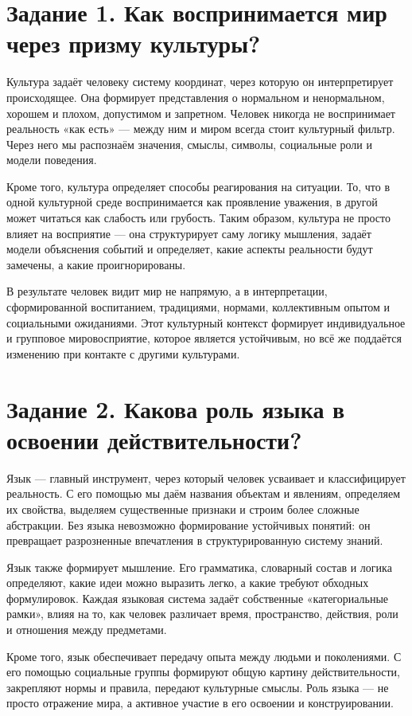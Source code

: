 \documentclass[14pt,a4paper]{extarticle}
\begin{document}
\section{Задание 1. Как воспринимается мир через призму культуры?}
\begin{sloppypar}
Культура задаёт человеку систему координат, через которую он интерпретирует
    происходящее. Она формирует представления о нормальном и ненормальном,
    хорошем и плохом, допустимом и запретном. Человек никогда не воспринимает
    реальность «как есть» — между ним и миром всегда стоит культурный фильтр.
    Через него мы распознаём значения, смыслы, символы, социальные роли и
    модели поведения.

    Кроме того, культура определяет способы реагирования на ситуации. То, что в
    одной культурной среде воспринимается как проявление уважения, в другой
    может читаться как слабость или грубость. Таким образом, культура не просто
    влияет на восприятие — она структурирует саму логику мышления, задаёт
    модели объяснения событий и определяет, какие аспекты реальности будут
    замечены, а какие проигнорированы.

    В результате человек видит мир не напрямую, а в интерпретации,
    сформированной воспитанием, традициями, нормами, коллективным опытом и
    социальными ожиданиями. Этот культурный контекст формирует индивидуальное и
    групповое мировосприятие, которое является устойчивым, но всё же поддаётся
    изменению при контакте с другими культурами.
\end{sloppypar}

\section{Задание 2. Какова роль языка в освоении действительности?}
\begin{sloppypar}
Язык — главный инструмент, через который человек усваивает и классифицирует
    реальность. С его помощью мы даём названия объектам и явлениям, определяем
    их свойства, выделяем существенные признаки и строим более сложные
    абстракции. Без языка невозможно формирование устойчивых понятий: он
    превращает разрозненные впечатления в структурированную систему знаний.

    Язык также формирует мышление. Его грамматика, словарный состав и логика
    определяют, какие идеи можно выразить легко, а какие требуют обходных
    формулировок. Каждая языковая система задаёт собственные «категориальные
    рамки», влияя на то, как человек различает время, пространство, действия,
    роли и отношения между предметами.

    Кроме того, язык обеспечивает передачу опыта между людьми и поколениями. С
    его помощью социальные группы формируют общую картину действительности,
    закрепляют нормы и правила, передают культурные смыслы. Роль языка
    — не просто отражение мира, а активное участие в его освоении и
    конструировании.
\end{sloppypar}
\end{document}

